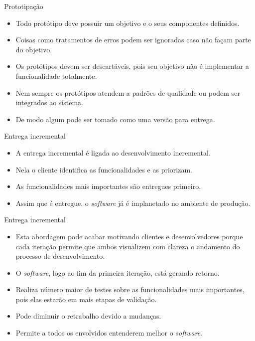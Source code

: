 \documentclass[11pt]{beamer}
\begin{document}
   \begin{frame}{Prototipação}
      \begin{itemize}
         \item Todo protótipo deve possuir um objetivo e o seus componentes definidos.
         \item Coisas como tratamentos de erros podem ser ignoradas caso não façam parte do objetivo.
         \item Os protótipos devem ser descartáveis, pois seu objetivo não é implementar a funcionalidade totalmente.
         \item Nem sempre os protótipos atendem a padrões de qualidade ou podem ser integrados ao sistema.
         \item De modo algum pode ser tomado como uma versão para entrega.
      \end{itemize}
   \end{frame}

   \begin{frame}{Entrega incremental}
      \begin{itemize}
         \item A entrega incremental é ligada ao desenvolvimento incremental.
         \item Nela o cliente identifica as funcionalidades e as priorizam.
         \item As funcionalidades mais importantes são entregues primeiro.
         \item Assim que é entregue, o \textit{software} já é implanetado no ambiente de produção.
      \end{itemize}
   \end{frame}
       
   \begin{frame}{Entrega incremental}
      \begin{itemize}
         \item Esta abordagem pode acabar motivando clientes e desenvolvedores porque cada iteração permite que ambos visualizem com clareza o andamento do processo de desenvolvimento.
         \item O \textit{software}, logo ao fim da primeira iteração, está gerando retorno.
         \item Realiza número maior de testes sobre as funcionalidades mais importantes, pois elas estarão em mais etapas de validação.
         \item Pode diminuir o retrabalho devido a mudanças.
         \item Permite a todos os envolvidos entenderem melhor o \textit{software}.
      \end{itemize}
   \end{frame}    
    
\end{document}

